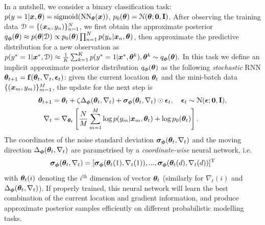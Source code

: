 In a nutshell, we consider a binary classification task: $p(y = 1|\bm{x}, \bm{\theta}) = \text{sigmoid}(\text{NN}_{\bm{\theta}}(\bm{x}))$, $p_0(\bm{\theta}) = \mathcal{N}(\bm{\theta}; \bm{0}, \mathbf{I})$. After observing the training data $\mathcal{D} = \{(\bm{x}_n, y_n)\}_{n=1}^N$, we first obtain the approximate posterior $q_{\bm{\phi}}(\bm{\theta}) \approx p(\bm{\theta} | \mathcal{D}) \propto p_0(\bm{\theta}) \prod_{n=1}^N p(y_n | \bm{x}_n, \bm{\theta})$, then approximate the predictive distribution for a new observation as $ p(y^*=1|\bm{x}^*, \mathcal{D}) \approx \frac{1}{K} \sum_{k=1}^K p(y^*=1|\bm{x}^*, \bm{\theta}^k), \bm{\theta}^k \sim q_{\bm{\phi}}(\bm{\theta}). $ 
%
In this task we define an implicit approximate posterior distribution $q_{\bm{\phi}}(\bm{\theta})$ as the following \emph{stochastic} RNN $\bm{\theta}_{t+1} = \mathbf{f}(\bm{\theta}_t, \nabla_t, \bm{\epsilon}_t)$: given the current location $\bm{\theta}_t$ and the mini-batch data $\{ (\bm{x}_m, y_m) \}_{m=1}^M$, the update for the next step is
\begin{equation}
\begin{aligned}
\bm{\theta}_{t+1} &= \bm{\theta}_{t} + \zeta \Delta_{\bm{\phi}}(\bm{\theta}_t, \nabla_t) + \bm{\sigma}_{\bm{\phi}}(\bm{\theta}_t, \nabla_t) \odot \bm{\epsilon}_t, \quad \bm{\epsilon}_t \sim  \mathcal{N}(\bm{\epsilon}; \bm{0}, \mathbf{I}),\\
\nabla_t &= \nabla_{\bm{\theta}_t} \left[ \frac{N}{M} \sum_{m=1}^M \log p(y_m|\bm{x}_m, \bm{\theta}_t) + \log p_0(\bm{\theta}_t) \right] .
\end{aligned}
\end{equation}
The coordinates of the noise standard deviation $\bm{\sigma}_{\bm{\phi}}(\bm{\theta}_t, \nabla_t)$ and the moving direction $\Delta_{\bm{\phi}}(\bm{\theta}_t, \nabla_t)$ are parametrised by a \emph{coordinate-wise} neural network, i.e.~
$$\bm{\sigma}_{\bm{\phi}}(\bm{\theta}_t, \nabla_t) = [\bm{\sigma}_{\bm{\phi}}(\bm{\theta}_t(1), \nabla_t(1)), ..., \bm{\sigma}_{\bm{\phi}}(\bm{\theta}_t(d), \nabla_t(d)) ]^{\text{T}}$$
with $\bm{\theta}_t(i)$ denoting the $i^{\text{th}}$ dimension of vector $\bm{\theta}_t$ (similarly for $\nabla_t(i)$ and $\Delta_{\bm{\phi}}(\bm{\theta}_t, \nabla_t)$).
%
If properly trained, this neural network will learn the best combination of the current location and gradient information, and produce approximate posterior samples efficiently on different probabilistic modelling tasks.

